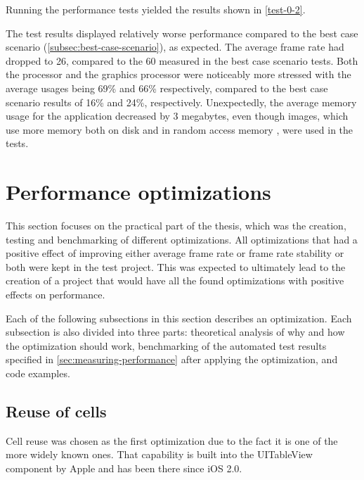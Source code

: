\documentclass[a4paper,12pt]{article}
\begin{document}
Running the performance tests yielded the results shown in \autoref{test-0-2}.

The test results displayed relatively worse performance compared to the best case scenario (\autoref{subsec:best-case-scenario}), as expected. The average frame rate had dropped to 26, compared to the 60 measured in the best case scenario tests. Both the processor and the graphics processor were noticeably more stressed with the average usages being 69\% and 66\% respectively, compared to the best case scenario results of 16\% and 24\%, respectively. Unexpectedly, the average memory usage for the application decreased by 3 megabytes, even though images, which use more memory both on disk and in random access memory \cite{UnderstandingFileSizes}, were used in the tests.

\section{Performance optimizations}
This section focuses on the practical part of the thesis, which was the creation, testing and benchmarking of different optimizations. All optimizations that had a positive effect of improving either average frame rate or frame rate stability or both were kept in the test project. This was expected to ultimately lead to the creation of a project that would have all the found optimizations with positive effects on performance.

Each of the following subsections in this section describes an optimization. Each subsection is also divided into three parts: theoretical analysis of why and how the optimization should work, benchmarking of the automated test results specified in \autoref{sec:measuring-performance} after applying the optimization, and code examples.

\subsection{Reuse of cells}
\label{subsec:reuse-of-cells}
Cell reuse was chosen as the first optimization due to the fact it is one of the more widely known ones. That capability is built into the UITableView component by Apple and has been there since iOS 2.0.\cite{HackingWithSwiftCellReuse}
\end{document}
